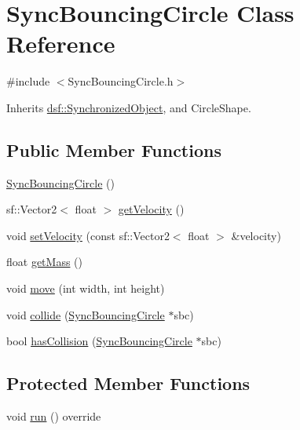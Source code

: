 \hypertarget{class_sync_bouncing_circle}{}\section{Sync\+Bouncing\+Circle Class Reference}
\label{class_sync_bouncing_circle}


{\ttfamily \#include $<$Sync\+Bouncing\+Circle.\+h$>$}



Inherits \hyperlink{classdsf_1_1_synchronized_object}{dsf\+::\+Synchronized\+Object}, and Circle\+Shape.

\subsection*{Public Member Functions}
\begin{DoxyCompactItemize}
\item 
\hyperlink{class_sync_bouncing_circle_aa00f50414fddd97cbb14fe702fa201e2}{Sync\+Bouncing\+Circle} ()
\item 
sf\+::\+Vector2$<$ float $>$ \hyperlink{class_sync_bouncing_circle_a53ee06bdeb5025dfd42a49c385e5a1c0}{get\+Velocity} ()
\item 
void \hyperlink{class_sync_bouncing_circle_a1e732f9061d50b87b227f7b57b3834bd}{set\+Velocity} (const sf\+::\+Vector2$<$ float $>$ \&velocity)
\item 
float \hyperlink{class_sync_bouncing_circle_ae9682f881b9bcb70450ae6546f3f28a3}{get\+Mass} ()
\item 
void \hyperlink{class_sync_bouncing_circle_a6c3d0788f0efb17e457f1a7d9500643b}{move} (int width, int height)
\item 
void \hyperlink{class_sync_bouncing_circle_a30bf8948d5c62d34d9f403228571886b}{collide} (\hyperlink{class_sync_bouncing_circle}{Sync\+Bouncing\+Circle} $\ast$sbc)
\item 
bool \hyperlink{class_sync_bouncing_circle_ab4c66394f5604d08cc1c1738f33376b5}{has\+Collision} (\hyperlink{class_sync_bouncing_circle}{Sync\+Bouncing\+Circle} $\ast$sbc)
\end{DoxyCompactItemize}
\subsection*{Protected Member Functions}
\begin{DoxyCompactItemize}
\item 
void \hyperlink{class_sync_bouncing_circle_a65add49b37f08c7c2c1ab24fc2251f5a}{run} () override
\end{DoxyCompactItemize}

